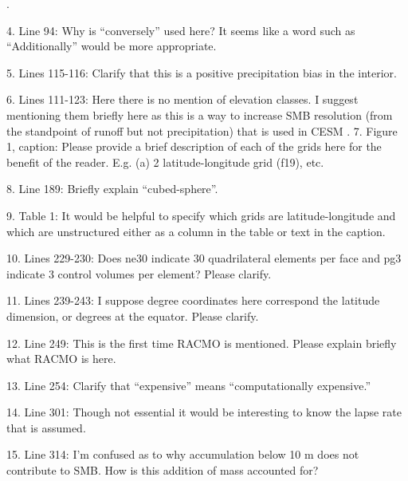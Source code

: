 \documentclass[12pt,oneside,a4paper]{article}%
\begin{document}
{\color{blue}{Added clarification for the meaning of quasi-uniform and variable-resolution. Decided against getting into the specifics of which dycore uses which grid, as this becomes apparent later on in the introduction}}.

4. Line 94: Why is “conversely” used here? It seems like a word such as “Additionally” would be more appropriate.  \newline

5. Lines 115-116: Clarify that this is a positive precipitation bias in the interior.  \newline

6. Lines 111-123: Here there is no mention of elevation classes. I suggest mentioning them briefly here as this is a way to increase SMB resolution (from the standpoint of runoff but not precipitation) that is used in CESM  \newline
.
7. Figure 1, caption: Please provide a brief description of each of the grids here for the benefit of the reader. E.g. (a) 2 latitude-longitude grid (f19), etc.  \newline

8. Line 189: Briefly explain “cubed-sphere”.  \newline

9. Table 1: It would be helpful to specify which grids are latitude-longitude and which are unstructured either as a column in the table or text in the caption.  \newline

10. Lines 229-230: Does ne30 indicate 30 quadrilateral elements per face and pg3 indicate 3 control volumes per element? Please clarify. \newline

11. Lines 239-243: I suppose degree coordinates here correspond the latitude dimension, or degrees at the equator. Please clarify.  \newline

12. Line 249: This is the first time RACMO is mentioned. Please explain briefly what RACMO is here.  \newline

13. Line 254: Clarify that “expensive” means “computationally expensive.” \newline

14. Line 301: Though not essential it would be interesting to know the lapse rate that is assumed. \newline

15. Line 314: I’m confused as to why accumulation below 10 m does not contribute to SMB. How is this addition of mass accounted for? \newline
\end{document}
